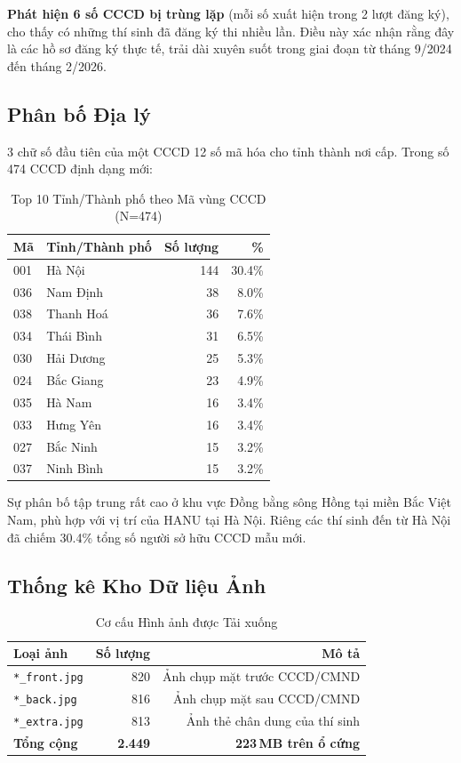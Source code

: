 \documentclass[12pt,a4paper]{article}
\begin{document}
\noindent \textbf{Phát hiện 6 số CCCD bị trùng lặp} (mỗi số xuất hiện trong 2 lượt đăng ký), cho thấy có những thí sinh đã đăng ký thi nhiều lần. Điều này xác nhận rằng đây là các hồ sơ đăng ký thực tế, trải dài xuyên suốt trong giai đoạn từ tháng 9/2024 đến tháng 2/2026.

\subsection{Phân bố Địa lý}

3 chữ số đầu tiên của một CCCD 12 số mã hóa cho tỉnh thành nơi cấp. Trong số 474 CCCD định dạng mới:

\begin{table}[H]
\centering
\caption{Top 10 Tỉnh/Thành phố theo Mã vùng CCCD (N=474)}
\begin{tabular}{@{}llrr@{}}
\toprule
\textbf{Mã} & \textbf{Tỉnh/Thành phố} & \textbf{Số lượng} & \textbf{\%} \\
\midrule
001 & Hà Nội & 144 & 30.4\% \\
036 & Nam Định & 38 & 8.0\% \\
038 & Thanh Hoá & 36 & 7.6\% \\
034 & Thái Bình & 31 & 6.5\% \\
030 & Hải Dương & 25 & 5.3\% \\
024 & Bắc Giang & 23 & 4.9\% \\
035 & Hà Nam & 16 & 3.4\% \\
033 & Hưng Yên & 16 & 3.4\% \\
027 & Bắc Ninh & 15 & 3.2\% \\
037 & Ninh Bình & 15 & 3.2\% \\
\bottomrule
\end{tabular}
\end{table}

\noindent Sự phân bố tập trung rất cao ở khu vực Đồng bằng sông Hồng tại miền Bắc Việt Nam, phù hợp với vị trí của HANU tại Hà Nội. Riêng các thí sinh đến từ Hà Nội đã chiếm 30.4\% tổng số người sở hữu CCCD mẫu mới.

\subsection{Thống kê Kho Dữ liệu Ảnh}

\begin{table}[H]
\centering
\caption{Cơ cấu Hình ảnh được Tải xuống}
\begin{tabular}{@{}lrr@{}}
\toprule
\textbf{Loại ảnh} & \textbf{Số lượng} & \textbf{Mô tả} \\
\midrule
\texttt{*\_front.jpg} & 820 & Ảnh chụp mặt trước CCCD/CMND \\
\texttt{*\_back.jpg} & 816 & Ảnh chụp mặt sau CCCD/CMND \\
\texttt{*\_extra.jpg} & 813 & Ảnh thẻ chân dung của thí sinh \\
\midrule
\textbf{Tổng cộng} & \textbf{2.449} & \textbf{223\,MB trên ổ cứng} \\
\bottomrule
\end{tabular}
\end{table}
\end{document}
